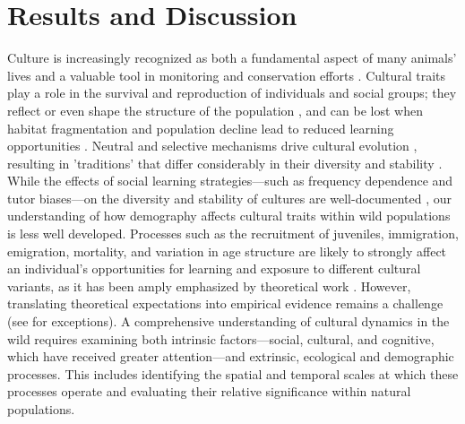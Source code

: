 \documentclass[9pt, onecolumn, twoside, lineno]{gsajnl}
\begin{document}
\maketitle
\vspace{-13pt}%

\section{Results and Discussion}

Culture is increasingly recognized as both a fundamental aspect of many animals' lives and a valuable tool in monitoring and conservation efforts \autocite{laiolo2007, brakes2021, jesmer2018}. Cultural traits play a role in the survival and reproduction of individuals and social groups; they reflect or even shape the structure of the population \autocite{brakes2019, garland2015}, and can be lost when habitat fragmentation and population decline lead to reduced learning opportunities \autocite{paxton2019, crates2021}. Neutral and selective mechanisms drive cultural evolution \autocite{potvin2015, williams2021, williams2013, youngblood2022, williams2022}, resulting in 'traditions' that differ considerably in their diversity and stability \autocite{tchernichovski2017}. While the effects of social learning strategies---such as frequency dependence and tutor biases---on the diversity and stability of cultures are well-documented \autocite{pike2010, kendal2015, aplin2017, lachlan2018, tchernichovski2021}, our understanding of how demography affects cultural traits within wild populations is less well developed. Processes such as the recruitment of juveniles, immigration, emigration, mortality, and variation in age structure are likely to strongly affect an individual's opportunities for learning and exposure to different cultural variants, as it has been amply emphasized by theoretical work \autocite{deffner2022a, deffner2022, kandler2017, kandler2023, fogarty2019, deffner2020, derex2016, derex2018, kirby2021, nunn2009, barta2023, dyble2024, chimento2024}. However, translating theoretical expectations into empirical evidence remains a challenge (see \autocite{chimento2021, fayet2014, payne1993, graham2017, laiolo2008} for exceptions). A comprehensive understanding of cultural dynamics in the wild requires examining both intrinsic factors---social, cultural, and cognitive, which have received greater attention---and extrinsic, ecological and demographic processes. This includes identifying the spatial and temporal scales at which these processes operate and evaluating their relative significance within natural populations.
\end{document}
